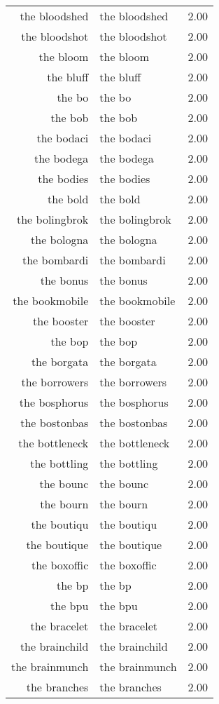 \begin{table}[ht]
\begin{tabular}{rlr}
  the bloodshed & the bloodshed & 2.00 \\ 
  the bloodshot & the bloodshot & 2.00 \\ 
  the bloom & the bloom & 2.00 \\ 
  the bluff & the bluff & 2.00 \\ 
  the bo & the bo & 2.00 \\ 
  the bob & the bob & 2.00 \\ 
  the bodaci & the bodaci & 2.00 \\ 
  the bodega & the bodega & 2.00 \\ 
  the bodies & the bodies & 2.00 \\ 
  the bold & the bold & 2.00 \\ 
  the bolingbrok & the bolingbrok & 2.00 \\ 
  the bologna & the bologna & 2.00 \\ 
  the bombardi & the bombardi & 2.00 \\ 
  the bonus & the bonus & 2.00 \\ 
  the bookmobile & the bookmobile & 2.00 \\ 
  the booster & the booster & 2.00 \\ 
  the bop & the bop & 2.00 \\ 
  the borgata & the borgata & 2.00 \\ 
  the borrowers & the borrowers & 2.00 \\ 
  the bosphorus & the bosphorus & 2.00 \\ 
  the bostonbas & the bostonbas & 2.00 \\ 
  the bottleneck & the bottleneck & 2.00 \\ 
  the bottling & the bottling & 2.00 \\ 
  the bounc & the bounc & 2.00 \\ 
  the bourn & the bourn & 2.00 \\ 
  the boutiqu & the boutiqu & 2.00 \\ 
  the boutique & the boutique & 2.00 \\ 
  the boxoffic & the boxoffic & 2.00 \\ 
  the bp & the bp & 2.00 \\ 
  the bpu & the bpu & 2.00 \\ 
  the bracelet & the bracelet & 2.00 \\ 
  the brainchild & the brainchild & 2.00 \\ 
  the brainmunch & the brainmunch & 2.00 \\ 
  the branches & the branches & 2.00 \\ 

\end{tabular}
\end{table}
